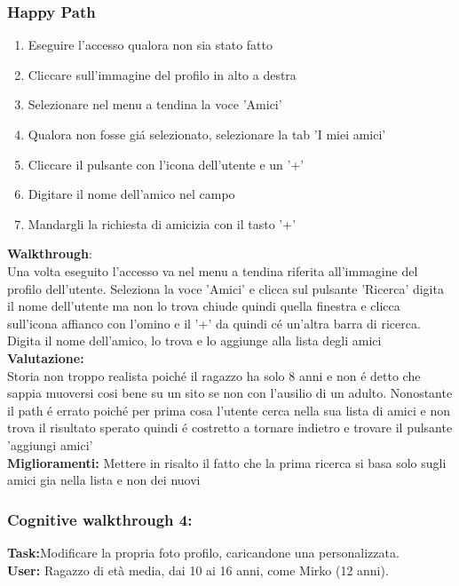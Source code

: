 \documentclass[../Report.tex]{subfiles}
\begin{document}
    \subsubsection{Happy Path}
    \begin{enumerate}
        \item Eseguire l'accesso qualora non sia stato fatto 
        \item Cliccare sull'immagine del profilo in alto a destra
        \item Selezionare nel menu a tendina la voce 'Amici'
        \item Qualora non fosse giá selezionato, selezionare la tab 'I miei amici'
        \item Cliccare il pulsante con l'icona dell'utente e un '+'
        \item Digitare il nome dell'amico nel campo
        \item Mandargli la richiesta di amicizia con il tasto '+'
    \end{enumerate}
    \textbf{Walkthrough}:\\
    Una volta eseguito l'accesso va nel menu a tendina riferita all'immagine del profilo dell'utente.
    Seleziona la voce 'Amici' e clicca sul pulsante 'Ricerca' digita il nome dell'utente ma non lo trova chiude quindi quella finestra e clicca sull'icona affianco con l'omino e il '+' da quindi cé un'altra barra di ricerca.
    Digita il nome dell'amico, lo trova e lo aggiunge alla lista degli amici\\

    \textbf{Valutazione:}\\Storia non troppo realista poiché il ragazzo ha solo 8 anni e non é detto che sappia muoversi cosi bene su un sito se non con l'ausilio di un adulto.
    Nonostante il path é errato poiché per prima cosa l'utente cerca nella sua lista di amici e non trova il risultato sperato quindi é costretto a tornare indietro e trovare il pulsante 'aggiungi amici'\\

    \textbf{Miglioramenti:} Mettere in risalto il fatto che la prima ricerca si basa solo sugli amici gia nella lista e non dei nuovi

    \subsubsection{Cognitive walkthrough 4:}
    \textbf{Task:}Modificare la propria foto profilo, caricandone una personalizzata.
    \\
    \textbf{User:} Ragazzo di età media, dai 10 ai 16 anni, come Mirko (12 anni).
\end{document}
